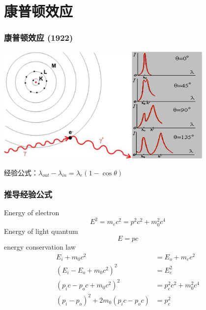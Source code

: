 \section{康普顿效应}

\begin{frame}   
    \frametitle{康普顿效应 (1922)}
    \begin{center}
        \includegraphics[width=0.8\textwidth]{figs/compton.png}
    \end{center}  
    经验公式：$\lambda_{out}-\lambda_{in}=\lambda_e(1-\cos \theta)$
\end{frame}

\begin{frame}  
    \frametitle{推导经验公式} 
    Energy of electron 
    \begin{equation*}
        E^2 =m_ec^2=p^2c^2 +m_0 ^2 c^4 
    \end{equation*}
    Energy of light quantum
    \begin{equation*}
        E =pc 
    \end{equation*}
    energy conservation law
    \begin{equation*}
        \begin{split}
        E_i + m_0 c^2 &= E_o + m_ec^2 \\
        (E_i -E_o + m_0 c^2)^2 &= E_e ^2\\
        (p_i c-p_o c + m_0 c^2) ^2 &= p_e ^2 c^2 +m_0 ^2 c^4 \\
        (p_i-p_o)^2 +2 m_0 (p_i c-p_o c) &= p_e ^2
    \end{split}
    \end{equation*}
\end{frame}


